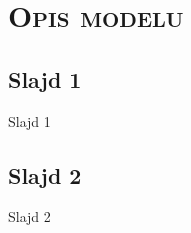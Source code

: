 \section{\scshape Opis modelu}

\subsection{Slajd 1}
\begin{frame}{Slajd 1}
\end{frame}

\subsection{Slajd 2}
\begin{frame}{Slajd 2}
\end{frame}